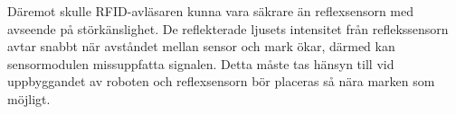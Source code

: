 \documentclass[11pt]{article}
\begin{document}
\begin{flushleft}
Däremot skulle RFID-avläsaren kunna vara säkrare än reflexsensorn med avseende på störkänslighet. De reflekterade ljusets intensitet från reflekssensorn avtar snabbt när avståndet mellan sensor och mark ökar, därmed kan sensormodulen missuppfatta signalen. Detta måste tas hänsyn till vid uppbyggandet av roboten och reflexsensorn bör placeras så nära marken som möjligt.



\setcounter{secnumdepth}{0}
\pagebreak


\printbibliography


\setcounter{secnumdepth}{2}
\end{flushleft}
\end{document}
